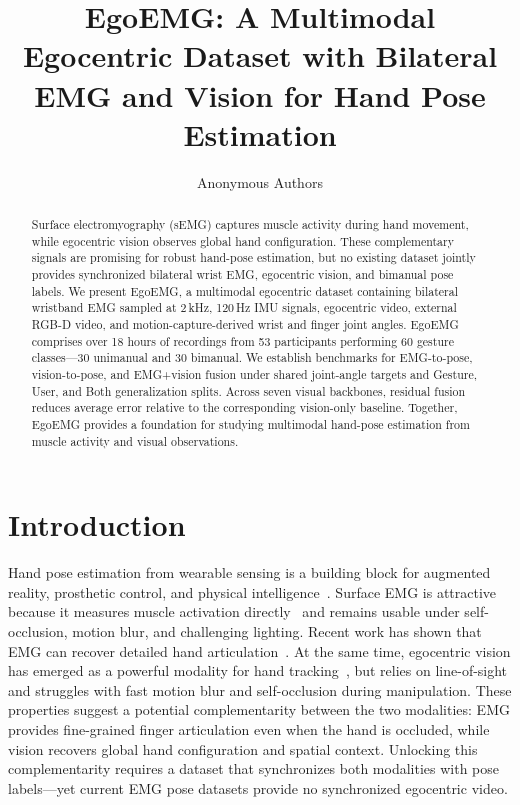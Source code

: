 \documentclass[letterpaper]{article} %
\title{EgoEMG: A Multimodal Egocentric Dataset with Bilateral EMG and Vision for Hand Pose Estimation}
\author{
    Anonymous Authors
}
\begin{document}
\maketitle

\begin{abstract}
Surface electromyography (sEMG) captures muscle activity during hand movement, while egocentric vision observes global hand configuration. These complementary signals are promising for robust hand-pose estimation, but no existing dataset jointly provides synchronized bilateral wrist EMG, egocentric vision, and bimanual pose labels. We present EgoEMG, a multimodal egocentric dataset containing bilateral wristband EMG sampled at 2\,kHz, 120\,Hz IMU signals, egocentric video, external RGB-D video, and motion-capture-derived wrist and finger joint angles. EgoEMG comprises over 18 hours of recordings from 53 participants performing 60 gesture classes---30 unimanual and 30 bimanual. We establish benchmarks for EMG-to-pose, vision-to-pose, and EMG+vision fusion under shared joint-angle targets and Gesture, User, and Both generalization splits. Across seven visual backbones, residual fusion reduces average error relative to the corresponding vision-only baseline. Together, EgoEMG provides a foundation for studying multimodal hand-pose estimation from muscle activity and visual observations.
\end{abstract}

\section{Introduction}

Hand pose estimation from wearable sensing is a building block for augmented reality, prosthetic control, and physical intelligence~\citep{emg2pose,ninapro,zhao2026dexemg}. Surface EMG is attractive because it measures muscle activation directly~\citep{farina2014} and remains usable under self-occlusion, motion blur, and challenging lighting. Recent work has shown that EMG can recover detailed hand articulation~\citep{emg2pose,emg2tendon,vqmyopose}. At the same time, egocentric vision has emerged as a powerful modality for hand tracking~\citep{hamer,h2o}, but relies on line-of-sight and struggles with fast motion blur and self-occlusion during manipulation. These properties suggest a potential complementarity between the two modalities: EMG provides fine-grained finger articulation even when the hand is occluded, while vision recovers global hand configuration and spatial context. Unlocking this complementarity requires a dataset that synchronizes both modalities with pose labels---yet current EMG pose datasets provide no synchronized egocentric video.
\end{document}
